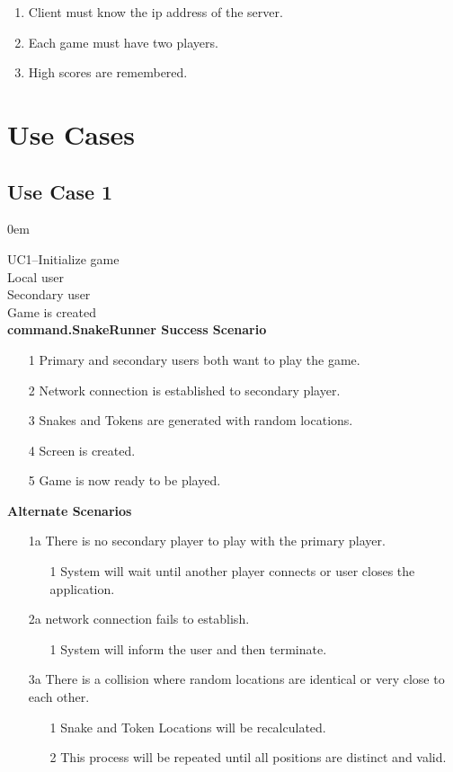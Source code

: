 \documentclass[titlepage]{article}
\begin{document}
	\begin{enumerate}
		\item Client must know the ip address of the server.
		\item Each game must have two players.
		\item High scores are remembered.
	\end{enumerate}
	
	\section{Use Cases}
	\subsection{Use Case 1}
	\itemsep0em 

			\textbf{} UC1--Initialize game\\
			\textbf{} Local user\\
			\textbf{} Secondary user\\
			\textbf{} Game is created\\
			\textbf{command.SnakeRunner Success Scenario}
				\begin{enumerate}
					\itemsep0em 
					\item[1] Primary and secondary users both want to play the game.
					\item[2] Network connection is established to secondary player.
					\item[3] Snakes and Tokens are generated with random locations.
					\item[4] Screen is created.
					\item[5] Game is now ready to be played.
				\end{enumerate}
			\textbf{Alternate Scenarios}
			\begin{enumerate}
									\itemsep0em 
				\item[1a]There is no secondary player to play with the primary player.
				\begin{enumerate}
										\itemsep0em 
					\item[1]System will wait until another player connects or user closes the application.
				\end{enumerate}
				\item[2a]network connection fails to establish.
				\begin{enumerate}
										\itemsep0em 
					\item[1]System will inform the user and then terminate.
				\end{enumerate}
				\item[3a]There is a collision where random locations are identical or very close to each other.
				\begin{enumerate}
										\itemsep0em 
					\item[1]Snake and Token Locations will be recalculated.
					\item[2]This process will be repeated until all positions are distinct and valid.
				\end{enumerate}
			\end{enumerate}
		
\end{document}
